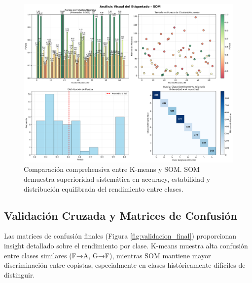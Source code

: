 \documentclass[12pt,a4paper]{article}
\begin{document}
\begin{figure}[H]
    \centering
    \includegraphics[width=\textwidth]{figures/figura__comparacion_algoritmos.pdf}
    \caption{Comparación comprehensiva entre K-means y SOM. SOM demuestra superioridad sistemática en accuracy, estabilidad y distribución equilibrada del rendimiento entre clases.}
    \label{fig:comparacion_final}
\end{figure}

\subsection{Validación Cruzada y Matrices de Confusión}

Las matrices de confusión finales (Figura \ref{fig:validacion_final}) proporcionan insight detallado sobre el rendimiento por clase. K-means muestra alta confusión entre clases similares (F→A, G→F), mientras SOM mantiene mayor discriminación entre copistas, especialmente en clases históricamente difíciles de distinguir.
\end{document}
